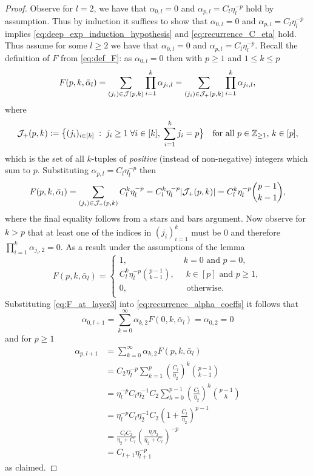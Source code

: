\begin{proof}
Observe for $l=2$, we have that $\alpha_{0,l} = 0$ and $\alpha_{p, l} = C_l \eta_l^{-p}$ hold by assumption.  Thus by induction it suffices to show that $\alpha_{0, l} = 0$ and $\alpha_{p, l} = C_l \eta_l^{-p}$ implies \eqref{eq:deep_exp_induction_hypothesis} and \eqref{eq:recurrence_C_eta} hold.  Thus assume for some $l \geq 2$ we have that $\alpha_{0, l} = 0$ and $\alpha_{p, l} = C_l \eta_l^{-p}$. 
 Recall the definition of $F$ from \eqref{eq:def_F}: as $\alpha_{0,l} = 0$ then with $p \geq 1$ and $1 \leq k \leq p$
\[
F(p,k,\bar{\alpha}_l) = \sum_{(j_i) \in \mathcal{J}(p,k)} \prod_{i=1}^k \alpha_{j_i,l} = \sum_{(j_i) \in \mathcal{J}_{+}(p,k)} \prod_{i=1}^k \alpha_{j_i,l},
\]
where
\[
    \mathcal{J}_{+}(p,k) \vcentcolon= \big\{ (j_i)_{i \in [k]} \; : \; j_i \geq 1 \; \forall i \in [k], \; \sum_{i=1}^k j_i = p  \big\} \quad \text{for all $p \in \mathbb{Z}_{\geq 1}$, $k \in [p]$},
\]
which is the set of all $k$-tuples of \textit{positive} (instead of non-negative) integers which sum to $p$. Substituting $\alpha_{p,l} = C_l \eta_l^{-p}$ then
\[
    F(p,k,\bar{\alpha}_l) = \sum_{(j_i) \in \mathcal{J}_{+}(p,k)} C_l^k \eta_l^{-p} = C_l^k \eta_l^{-p} |\mathcal{J}_{+}(p,k)| =C_l^k \eta_l^{-p} \binom{p-1}{k-1}, 
\]
where the final equality follows from a stars and bars argument. Now observe for $k > p$ that at least one of the indices in $(j_i)_{i=1}^k$ must be 0 and therefore $\prod_{i=1}^k \alpha_{j_i,2} = 0$. As a result under the assumptions of the lemma
\begin{equation} \label{eq:F_at_layer3}
    F(p,k,\bar{\alpha}_l) = 
    \begin{cases}
        1, \; &k=0 \text{ and } p = 0, \\
        C_l^k \eta_l^{-p} \binom{p-1}{k-1}, \; & \; k \in [p] \text{ and } p \geq 1,\\
         0, \; &\text{ otherwise.}\\
    \end{cases}
\end{equation}
Substituting \eqref{eq:F_at_layer3} into \eqref{eq:recurrence_alpha_coeffs} it follows that
\[
\alpha_{0,l+1}  = \sum_{k=0}^{\infty} \alpha_{k,2} F(0,k,\bar{\alpha}_{l}) = \alpha_{0,2} = 0
\]
and for $p \geq 1$
\[
\begin{aligned}
\alpha_{p,l+1} &= \sum_{k=0}^{\infty} \alpha_{k,2} F(p,k,\bar{\alpha}_{l})\\
& = C_2 \eta_l^{-p} \sum_{k=1}^p  \left(\frac{C_l}{\eta_2} \right)^{k}  \binom{p-1}{k-1}\\
& = \eta_l^{-p} C_l \eta_2^{-1} C_2 \sum_{h=0}^{p-1} \left(\frac{C_l}{\eta_2} \right)^{h}\binom{p-1}{h}\\
& = \eta_l^{-p} C_l \eta_2^{-1} C_2 \left(1 + \frac{C_l}{\eta_2} \right)^{p-1}\\
& = \frac{C_l C_2}{\eta_2 + C_l} \left(\frac{\eta_l \eta_2}{\eta_2 + C_l}\right)^{-p}\\
& = C_{l+1} \eta_{l+1}^{-p}
\end{aligned}
\]
as claimed.
\end{proof}



